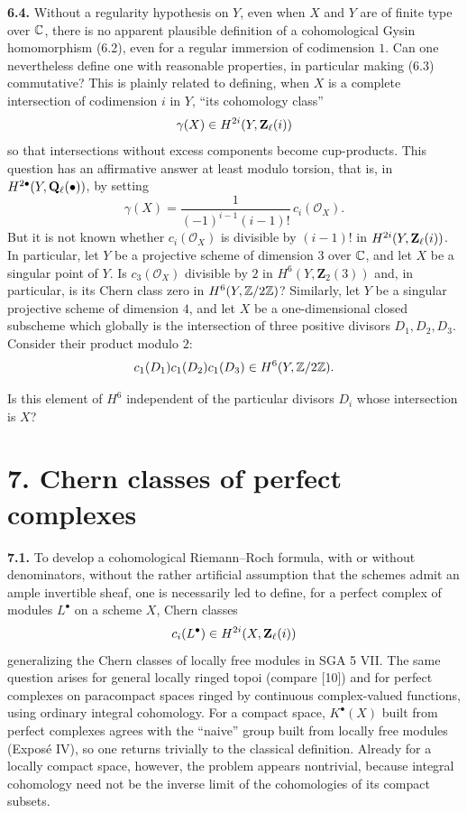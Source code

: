 \textbf{6.4.} Without a regularity hypothesis on $Y$, even when $X$ and $Y$
are of finite type over $\mathbb C$, there is no apparent plausible definition of
a cohomological Gysin homomorphism (6.2), even for a regular immersion of
codimension $1$. Can one nevertheless define one with reasonable
properties, in particular making (6.3) commutative? This is plainly related
to defining, when $X$ is a complete intersection of codimension $i$ in
$Y$, ``its cohomology class''
\[
 \gamma(X)\in H^{2i}(Y,\mathbf Z_\ell(i))
\]
so that intersections without excess components become cup-products. This
question has an affirmative answer at least modulo torsion, that is, in
$H^{2\bullet}(Y,\mathbf Q_\ell(\bullet))$, by setting
\[
 \gamma(X)=\frac{1}{(-1)^{i-1}(i-1)!}\,c_i(\mathcal O_X).
\]
But it is not known whether $c_i(\mathcal O_X)$ is divisible by $(i-1)!$
in $H^{2i}(Y,\mathbf Z_\ell(i))$. In particular, let $Y$ be a projective scheme of
dimension $3$ over $\mathbb C$, and let $X$ be a singular point of $Y$. Is
$c_3(\mathcal O_X)$ divisible by $2$ in $H^6(Y,\mathbf Z_2(3))$ and, in
particular, is its Chern class zero in $H^6(Y,\mathbb Z/2\mathbb Z)$? Similarly, let $Y$
be a singular projective scheme of dimension $4$, and let $X$ be a
one-dimensional closed subscheme which globally is the intersection of
three positive divisors $D_1,D_2,D_3$. Consider their product modulo $2$:
\[
 c_1(D_1)c_1(D_2)c_1(D_3)\in H^6(Y,\mathbb Z/2\mathbb Z).
\]

Is this element of $H^6$ independent of the particular divisors $D_i$
whose intersection is $X$?

\section*{7. Chern classes of perfect complexes}

\textbf{7.1.} To develop a cohomological Riemann--Roch formula, with or
without denominators, without the rather artificial assumption that the
schemes admit an ample invertible sheaf, one is necessarily led to define,
for a perfect complex of modules $L^\bullet$ on a scheme $X$, Chern classes
\[
 c_i(L^\bullet)\in H^{2i}(X,\mathbf Z_\ell(i))
\]
generalizing the Chern classes of locally free modules in SGA 5 VII. The
same question arises for general locally ringed topoi (compare [10]) and
for perfect complexes on paracompact spaces ringed by continuous
complex-valued functions, using ordinary integral cohomology. For a compact
space, $K^\bullet(X)$ built from perfect complexes agrees with the ``naive''
group built from locally free modules (Exposé IV), so one returns trivially
to the classical definition. Already for a locally compact space, however,
the problem appears nontrivial, because integral cohomology need not be the
inverse limit of the cohomologies of its compact subsets.

